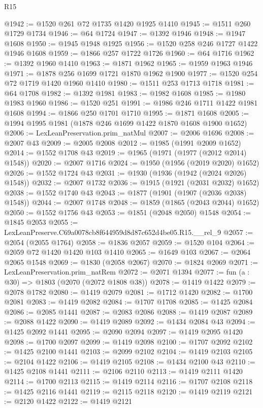 \begin{lexlean}{R15}
\begin{coremodule}
@1942 := @1520 @261 @72 @1735 @1420 @1925 @1410
@1945 := @1511 @260 @1729 @1734
@1946 := @64 @1724
@1947 := @1392 @1946
@1948 := @1947 @1608
@1950 := @1945 @1948 @1925
@1956 := @1520 @258 @246 @1727 @1422 @1946 @1608
@1959 := @1866 @257 @1722 @1726
@1960 := @64 @1716
@1962 := @1392 @1960 @1410
@1963 := @1871 @1962
@1965 := @1959 @1963 @1946
@1971 := @1878 @256 @1699 @1721 @1870 @1962 @1900
@1977 := @1520 @254 @72 @1719 @1420 @1960 @1410
@1980 := @1511 @253 @1713 @1718
@1981 := @64 @1708
@1982 := @1392 @1981
@1983 := @1982 @1608
@1985 := @1980 @1983 @1960
@1986 := @1520 @251
@1991 := @1986 @246 @1711 @1422 @1981 @1608
@1994 := @1866 @250 @1701 @1710
@1995 := @1871 @1608
@2005 := @1994 @1995 @1981 (@1878 @246 @1699 @1422 @1870 @1608 @1900 @1652)
@2006 := LexLeanPreservation.prim_natMul
@2007 := @2006 @1696
@2008 := @2007 @43
@2009 := @2005 @2008
@2012 := @1985 (@1991 @2009 @1652)
@2014 := @1552 @1708 @43
@2019 := @1965 (@1971 (@1977 (@2012 @2014) @1548))
@2020 := @2007 @1716
@2024 := @1950 (@1956 (@2019 @2020) @1652)
@2026 := @1552 @1724 @43
@2031 := @1930 (@1936 (@1942 (@2024 @2026) @1548))
@2032 := @2007 @1732
@2036 := @1915 (@1921 (@2031 @2032) @1652)
@2038 := @1552 @1740 @43
@2043 := @1877 (@1901 (@1907 (@2036 @2038) @1548))
@2044 := @2007 @1748
@2048 := @1859 (@1865 (@2043 @2044) @1652)
@2050 := @1552 @1756 @43
@2053 := @1851 (@2048 @2050) @1548
@2054 := @1845 @2053
@2055 := LexLeanPreserve.C69a0078cb8f644959d8d87c652d4be05.R15.__rel_9
@2057 := @2054 (@2055 @1764)
@2058 := @1836 @2057
@2059 := @1520 @104
@2064 := @2059 @72 @1420 @1420 @103 @1410
@2065 := @1649 @103
@2067 := @2064 @2065 @1548
@2069 := @1830 (@2058 @2067)
@2070 := @1824 @2069
@2071 := LexLeanPreservation.prim_natRem
@2072 := @2071 @1394
@2077 := fun (a : @30) => @1803 (@2070 (@2072 @1808 @38))
@2078 := @1419 @1422
@2079 := @2078 @1782
@2080 := @1419 @2079
@2081 := @1712 @1420
@2082 := @1700 @2081
@2083 := @1419 @2082
@2084 := @1707 @1708
@2085 := @1425 @2084
@2086 := @2085 @1441
@2087 := @2083 @2086
@2088 := @1419 @2087
@2089 := @2088 @1422
@2090 := @1419 @2089
@2092 := @1434 @2084 @43
@2094 := @1425 @2092 @1441
@2095 := @2090 @2094
@2097 := @1419 @2095 @1420
@2098 := @1700 @2097
@2099 := @1419 @2098
@2100 := @1707 @2092
@2102 := @1425 @2100 @1441
@2103 := @2099 @2102
@2104 := @1419 @2103
@2105 := @2104 @1422
@2106 := @1419 @2105
@2108 := @1434 @2100 @43
@2110 := @1425 @2108 @1441
@2111 := @2106 @2110
@2113 := @1419 @2111 @1420
@2114 := @1700 @2113
@2115 := @1419 @2114
@2116 := @1707 @2108
@2118 := @1425 @2116 @1441
@2119 := @2115 @2118
@2120 := @1419 @2119
@2121 := @2120 @1422
@2122 := @1419 @2121

\end{coremodule}
\end{lexlean}
